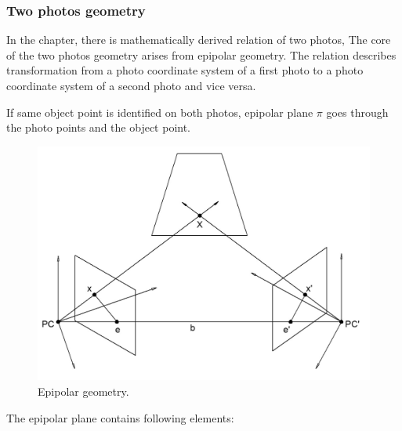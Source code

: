 \documentclass[a4paper,12pt]{article}
\begin{document}
\subsubsection{Two photos geometry}



In the chapter, there is mathematically derived relation of two photos,
The core of the two photos geometry arises from epipolar geometry.
The relation describes transformation from a photo coordinate system of a first photo to 
a photo coordinate system of a second photo and vice versa.

If same object point is identified on both photos,  
epipolar plane $\pi$ goes through the photo points and the object point. 

\begin{figure}[h]
    \centering
    \includegraphics[scale=0.3]{figures/epipolar.png}
    \caption{Epipolar geometry.}
    \label{fig:epipolae}
\end{figure}

The epipolar plane contains following elements:

\end{document}
